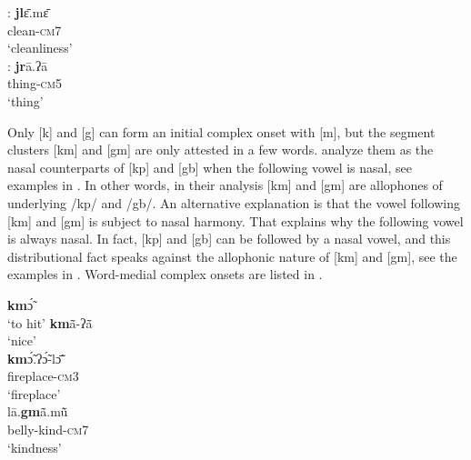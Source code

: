 \documentclass[output=paper]{langscibook}
\begin{document}
\begin{exe}
\begin{multicols}{2}
\begin{xlisti}
        \ex \glll [jl]:         \textbf{jl}ɛ̄.mɛ̄ \\
            {}      clean-\textsc{cm}7\\
            {} `cleanliness'\\
        \ex \glll [jr]:       \textbf{jr}ā.ʔā\\
            {}              thing-\textsc{cm}5\\
            {}              `thing'\\
        \end{xlisti}
    \end{multicols}
\end{exe}


Only [k] and [g] can form an initial complex onset with [m], but the segment clusters [km] and [gm] are only attested in a few words. \citet{Herault1973} analyze them as the nasal counterparts of [kp] and [gb] when the following vowel is nasal, see examples in . In other words, in their analysis [km] and [gm] are allophones of underlying /kp/ and /gb/. An alternative explanation is that the vowel following [km] and [gm] is subject to nasal harmony. That explains why the following vowel is always nasal. In fact, [kp] and [gb] can be followed by a nasal vowel, and this distributional fact speaks against the allophonic nature of [km] and [gm], see the examples in . Word-medial complex onsets are listed in .


\begin{exe}\setlength{\multicolsep}{0pt}
    \ex \label{ex:traore:velarPlusNasalComplexOnset:13}
    \begin{multicols}{2}
    \begin{xlist}
        \ex \textbf{km}ɔ̃́ \\
            `to hit'
        \ex \textbf{km}ã̄-ʔã̄  \\
            `nice'\\
        \ex \gll \textbf{km}ɔ̃́.ʔɔ̃́-lɔ̃̄ \\
            fireplace-\textsc{cm}3\\
            \trans `fireplace'\\
        \ex \gll lā.\textbf{gm}ã̄.mũ̄  \\
            belly-kind-\textsc{cm}7\\
            \trans `kindness'\\
    \end{xlist}
    \end{multicols}
\end{exe} 
\end{document}
